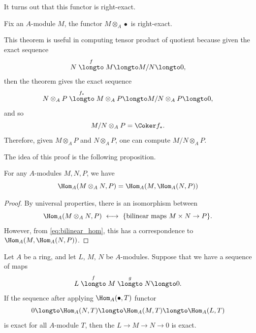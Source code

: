 It turns out that this functor is right-exact.
\begin{theorem}
    \label{thm:tensor_is_right_exact}
    Fix an $A$-module $M$, the functor $M\otimes_A \bullet$
    is right-exact.
\end{theorem}
This theorem is useful in computing tensor product
of quotient because given the exact sequence
$$N \stackrel f\longto M\longto M/N \longto 0,$$
then the theorem gives the exact sequence
$$N\otimes_A P \stackrel{f_*}\longto M\otimes_A P\longto M/N
\otimes_A P\longto 0,$$
and so 
$$M/N\otimes_A P = \Coker f_*.$$
Therefore, given $M\otimes_A P$ and $N\otimes_A P$,
one can compute $M/N\otimes_A P$.

The idea of this proof is the following proposition.
\begin{proposition}
    \label{prop:tensor_hom_adjunction}
    For any $A$-modules $M,N,P$, we have
    $$\Hom_A(M\otimes_A N, P) = \Hom_A(M,\Hom_A(N, P))$$
\end{proposition}
\begin{proof}
    By universal properties, there is an isomorphism 
    between 
    $$\Hom_A(M\otimes_A N, P)\ \longleftrightarrow\ 
    \{\text{bilinear maps } M\times N\to P\}.$$
    However, from \eqref{eq:bilinear_hom},
    this has a correspondence to 
    $\Hom_A(M, \Hom_A(N,P))$.
\end{proof}
\begin{lemma}
    \label{lem:hom_exactness}
    Let $A$ be a ring, and let $L$, $M$, $N$ be $A$-modules.
    Suppose that we have a sequence of maps
    $$L\stackrel f\longto M\stackrel g \longto N\longto 0.$$
    If the sequence after applying $\Hom_A(\bullet,T)$
    functor
    $$0\longto \Hom_A(N,T) \longto \Hom_A(M,T)\longto \Hom_A(L,T)$$
    is exact for all $A$-module $T$, 
    then the $L\to M\to N\to 0$ is exact.
\end{lemma}
